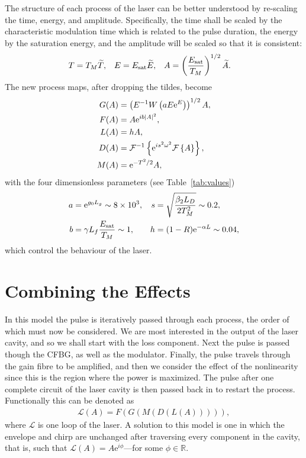 The structure of each process of the laser can be better understood by re-scaling the time, energy, and amplitude. Specifically, the time shall be scaled by the characteristic modulation time which is related to the pulse duration, the energy by the saturation energy, and the amplitude will be scaled so that it is consistent:
\begin{align*}
	T &= T_M \widetilde{T},& E &= E_{\textrm{sat}} \widetilde{E},& A &= \left( \frac{E_{\textrm{sat}}}{T_M} \right)^{1/2} \widetilde{A}.
\end{align*}
The new process maps, after dropping the tildes, become
\begin{subequations}
\begin{align}
\label{eq:gain}
G(A) &= \left(E^{-1} W \left( a E \textrm{e}^{E}\right) \right)^{1/2} A, \\
\label{eq:fibre}
F(A) &= A \textrm{e}^{i b |A|^2}, \\
\label{eq:loss}
L(A) &= h A, \\
\label{eq:disp}
D(A) &= \mathcal{F}^{-1}\left\{ \textrm{e}^{i s^2 \omega^2} \mathcal{F}\left\{ A \right\} \right\}, \\
\label{eq:mod}
M(A) &= \textrm{e}^{-T^2 / 2} A,
\end{align}
\end{subequations}
with the four dimensionless parameters (see Table~\ref{tab:values})
\begin{align*}
	a &= \textrm{e}^{g_0 L_g} \sim 8 \times 10^3,& s &= \sqrt{\frac{\beta_2 L_D}{2 T_M^2}} \sim 0.2, \\
	b &= \gamma L_f \frac{E_{\textrm{sat}}}{T_M} \sim 1,& h &= (1 - R) \textrm{e}^{-\alpha L} \sim 0.04,
\end{align*}
which control the behaviour of the laser.

\section{Combining the Effects}
In this model the pulse is iteratively passed through each process, the order of which must now be considered. We are most interested in the output of the laser cavity, and so we shall start with the loss component. Next the pulse is passed though the CFBG, as well as the modulator. Finally, the pulse travels through the gain fibre to be amplified, and then we consider the effect of the nonlinearity since this is the region where the power is maximized. The pulse after one complete circuit of the laser cavity is then passed back in to restart the process. Functionally this can be denoted as
\begin{align*}
	\mathcal{L}(A) = F(G(M(D(L(A))))),
\end{align*}
where $\mathcal{L}$ is one loop of the laser. A solution to this model is one in which the envelope and chirp are unchanged after traversing every component in the cavity, that is, such that $\mathcal{L}(A) = A \textrm{e}^{i \phi}$---for some $\phi \in \mathbb{R}$.

